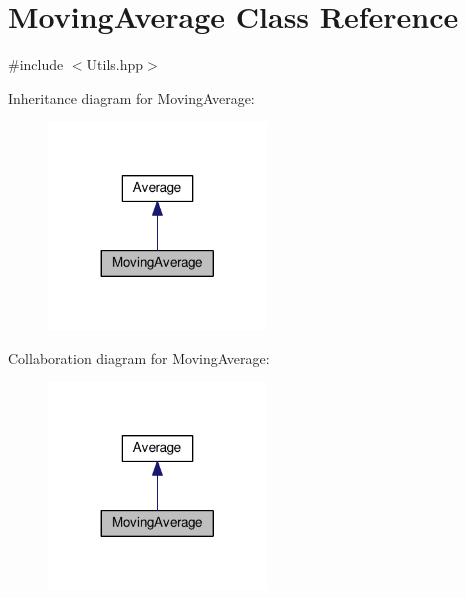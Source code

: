 \hypertarget{classMovingAverage}{}\section{Moving\+Average Class Reference}
\label{classMovingAverage}


{\ttfamily \#include $<$Utils.\+hpp$>$}



Inheritance diagram for Moving\+Average\+:\nopagebreak
\begin{figure}[H]
\begin{center}
\leavevmode
\includegraphics[width=164pt]{classMovingAverage__inherit__graph}
\end{center}
\end{figure}


Collaboration diagram for Moving\+Average\+:\nopagebreak
\begin{figure}[H]
\begin{center}
\leavevmode
\includegraphics[width=164pt]{classMovingAverage__coll__graph}
\end{center}
\end{figure}

